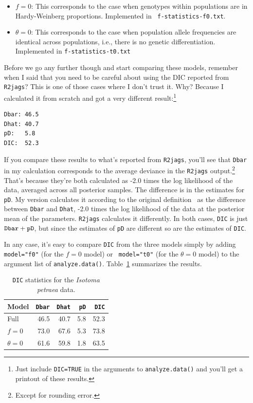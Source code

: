 \documentclass[12pt]{article}
\begin{document}
\begin{itemize}

\item $f=0$: This corresponds to the case when genotypes within
  populations are in Hardy-Weinberg proportions. Implemented in {\tt
    f-statistics-f0.txt}.

\item $\theta=0$: This corresponds to the case when population allele
  frequencies are identical across populations, i.e., there is no
  genetic differentiation. Implemented in {\tt f-statistics-t0.txt}

\end{itemize}
Before we go any further though and start comparing these models,
remember when I said that you need to be careful about using the DIC
reported from {\tt R2jags}? This is one of those cases where I don't
trust it. Why? Because I calculated it from scratch and got a very
different result:\footnote{Just include {\tt DIC=TRUE} in the
  arguments to {\tt analyze.data()} and you'll get a printout of these
  results.}
\begin{verbatim}
Dbar: 46.5
Dhat: 40.7
pD:   5.8
DIC:  52.3
\end{verbatim}
If you compare these results to what's reported from {\tt R2jags},
you'll see that {\tt Dbar} in my calculation corresponds to the
average deviance in the {\tt R2jags} output.\footnote{Except for
  rounding error.} That's because they're both calculated as -2.0
times the log likelihood of the data, averaged across all posterior
samples. The difference is in the estimates for {\tt pD}. My version
calculates it according to the original
definition~\cite{Spiegelhalter-etal-2002} as the difference between
{\tt Dbar} and {\tt Dhat}, -2.0 times the log likelihood of the data
at the posterior mean of the parameters. {\tt R2jags} calculates it
differently. In both cases, {\tt DIC} is just $\mbox{\tt
  Dbar}+\mbox{\tt pD}$, but since the estimates of {\tt pD} are
different so are the estimates of {\tt DIC}.

In any case, it's easy to compare {\tt DIC} from the three models
simply by adding {\tt model="f0"} (for the $f=0$ model) or {\tt
  model="t0"} (for the $\theta=0$ model) to the argument list of
{\tt analyze.data()}. Table~\ref{table:isotoma-DIC} summarizes the
results.

\begin{table}
\begin{center}
\begin{tabular}{l|rrrr}
\hline\hline
Model & {\tt Dbar} & {\tt Dhat} & {\tt pD} & {\tt DIC} \\
\hline
Full  & 46.5 & 40.7 & 5.8 & 52.3 \\
$f=0$ & 73.0 & 67.6 & 5.3 & 73.8 \\
$\theta=0$ & 61.6 & 59.8 & 1.8 & 63.5 \\
\hline
\end{tabular}
\end{center}
\caption{{\tt DIC} statistics for the {\it Isotoma petraea\/} data.}\label{table:isotoma-DIC}
\end{table}
\end{document}
